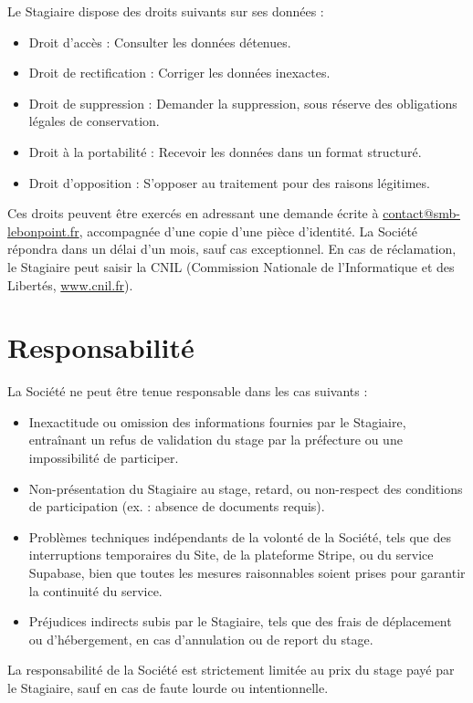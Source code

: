 \documentclass[a4paper,12pt]{article}
\begin{document}
Le Stagiaire dispose des droits suivants sur ses données :
\begin{itemize}
    \item Droit d'accès : Consulter les données détenues.
    \item Droit de rectification : Corriger les données inexactes.
    \item Droit de suppression : Demander la suppression, sous réserve des obligations légales de conservation.
    \item Droit à la portabilité : Recevoir les données dans un format structuré.
    \item Droit d'opposition : S'opposer au traitement pour des raisons légitimes.
\end{itemize}

Ces droits peuvent être exercés en adressant une demande écrite à \href{mailto:contact@smb-lebonpoint.fr}{contact@smb-lebonpoint.fr}, accompagnée d'une copie d'une pièce d'identité. La Société répondra dans un délai d'un mois, sauf cas exceptionnel. En cas de réclamation, le Stagiaire peut saisir la CNIL (Commission Nationale de l'Informatique et des Libertés, \href{https://www.cnil.fr}{www.cnil.fr}).

\section{Responsabilité}
La Société ne peut être tenue responsable dans les cas suivants :
\begin{itemize}
    \item Inexactitude ou omission des informations fournies par le Stagiaire, entraînant un refus de validation du stage par la préfecture ou une impossibilité de participer.
    \item Non-présentation du Stagiaire au stage, retard, ou non-respect des conditions de participation (ex. : absence de documents requis).
    \item Problèmes techniques indépendants de la volonté de la Société, tels que des interruptions temporaires du Site, de la plateforme Stripe, ou du service Supabase, bien que toutes les mesures raisonnables soient prises pour garantir la continuité du service.
    \item Préjudices indirects subis par le Stagiaire, tels que des frais de déplacement ou d'hébergement, en cas d'annulation ou de report du stage.
\end{itemize}

La responsabilité de la Société est strictement limitée au prix du stage payé par le Stagiaire, sauf en cas de faute lourde ou intentionnelle.
\end{document}
